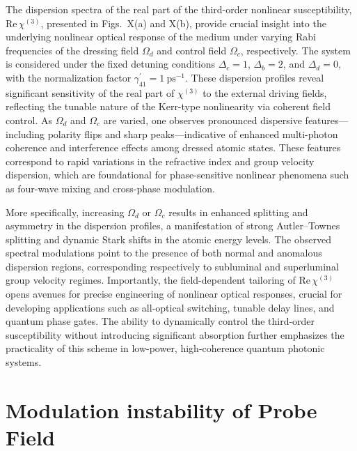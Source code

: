 \documentclass[a4paper,12pt]{article}
\begin{document}
The dispersion spectra of the real part of the third-order nonlinear susceptibility, \(\text{Re}\,\chi^{(3)}\), presented in Figs.~X(a) and X(b), provide crucial insight into the underlying nonlinear optical response of the medium under varying Rabi frequencies of the dressing field \(\Omega_d\) and control field \(\Omega_c\), respectively. The system is considered under the fixed detuning conditions \(\Delta_c = 1\), \(\Delta_b = 2\), and \(\Delta_d = 0\), with the normalization factor \(\gamma_{41}^\prime = 1~\text{ps}^{-1}\). These dispersion profiles reveal significant sensitivity of the real part of \(\chi^{(3)}\) to the external driving fields, reflecting the tunable nature of the Kerr-type nonlinearity via coherent field control. As \(\Omega_d\) and \(\Omega_c\) are varied, one observes pronounced dispersive features—including polarity flips and sharp peaks—indicative of enhanced multi-photon coherence and interference effects among dressed atomic states. These features correspond to rapid variations in the refractive index and group velocity dispersion, which are foundational for phase-sensitive nonlinear phenomena such as four-wave mixing and cross-phase modulation.

More specifically, increasing \(\Omega_d\) or \(\Omega_c\) results in enhanced splitting and asymmetry in the dispersion profiles, a manifestation of strong Autler--Townes splitting and dynamic Stark shifts in the atomic energy levels. The observed spectral modulations point to the presence of both normal and anomalous dispersion regions, corresponding respectively to subluminal and superluminal group velocity regimes. Importantly, the field-dependent tailoring of \(\text{Re}\,\chi^{(3)}\) opens avenues for precise engineering of nonlinear optical responses, crucial for developing applications such as all-optical switching, tunable delay lines, and quantum phase gates. The ability to dynamically control the third-order susceptibility without introducing significant absorption further emphasizes the practicality of this scheme in low-power, high-coherence quantum photonic systems.

\section{Modulation instability of Probe Field}
\end{document}

